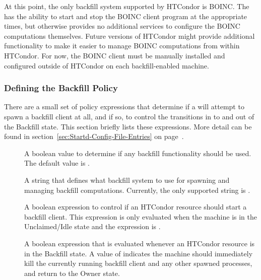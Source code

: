 At this point, the only backfill system supported by HTCondor is BOINC. 
The  has the ability to start and stop the BOINC client
program at the appropriate times, but otherwise provides no additional
services to configure the BOINC computations themselves.
Future versions of HTCondor might provide additional functionality to
make it easier to manage BOINC computations from within HTCondor.
For now, the BOINC client must be manually installed and configured
outside of HTCondor on each backfill-enabled machine.


\subsubsection{\label{sec:Backfill-Policy}Defining the Backfill Policy}


There are a small set of policy expressions that determine if a
 will attempt to spawn a backfill client at all, and if so,
to control the transitions in to and out of the Backfill state.
This section briefly lists these expressions.
More detail can be found in
section~\ref{sec:Startd-Config-File-Entries} on
page~\pageref{sec:Startd-Config-File-Entries}.

\begin{description}

\item[] A boolean value to determine if any
  backfill functionality should be used.
  The default value is .

\item[] A string that defines what backfill
  system to use for spawning and managing backfill computations.
  Currently, the only supported string is .
  
\item[] A boolean expression to control if an
  HTCondor resource should start a backfill client.
  This expression is only evaluated when the machine is in the Unclaimed/Idle
  state and the  expression is .

\item[] A boolean expression that is evaluated
  whenever an HTCondor resource is in the Backfill state.
  A value of  indicates the machine should immediately kill the
  currently running backfill client and any other spawned processes,
  and return to the Owner state.

\end{description}

